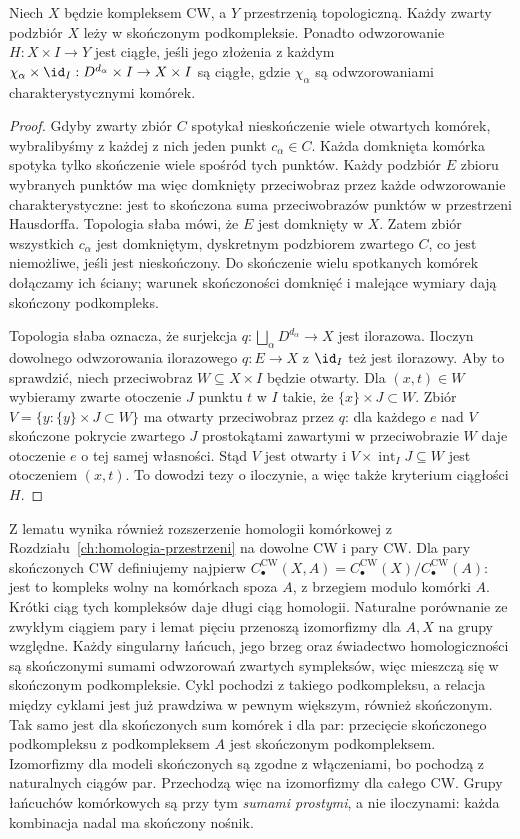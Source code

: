 \begin{lemat}
\label{lem:zwartosc-cw-pi}
Niech $X$ będzie kompleksem CW, a $Y$ przestrzenią topologiczną.
Każdy zwarty podzbiór $X$ leży w skończonym podkompleksie.
Ponadto odwzorowanie $H:X\times I\to Y$ jest ciągłe, jeśli jego złożenia
z każdym $\chi_\alpha\times\id_I:D^{d_\alpha}\times I\to X\times I$
są ciągłe, gdzie $\chi_\alpha$ są odwzorowaniami charakterystycznymi komórek.
\end{lemat}
\begin{proof}
Gdyby zwarty zbiór $C$ spotykał nieskończenie wiele otwartych komórek,
wybralibyśmy z każdej z nich jeden punkt $c_\alpha\in C$.
Każda domknięta komórka spotyka tylko skończenie wiele spośród tych punktów.
Każdy podzbiór $E$ zbioru wybranych punktów ma więc domknięty
przeciwobraz przez każde odwzorowanie charakterystyczne: jest to skończona
suma przeciwobrazów punktów w przestrzeni Hausdorffa.
Topologia słaba mówi, że $E$ jest domknięty w $X$.
Zatem zbiór wszystkich $c_\alpha$ jest domkniętym, dyskretnym
podzbiorem zwartego $C$, co jest niemożliwe, jeśli jest nieskończony.
Do skończenie wielu spotkanych komórek dołączamy ich ściany;
warunek skończoności domknięć i malejące wymiary dają skończony podkompleks.

Topologia słaba oznacza, że surjekcja
$q:\bigsqcup_\alpha D^{d_\alpha}\to X$ jest ilorazowa.
Iloczyn dowolnego odwzorowania ilorazowego $q:E\to X$ z $\id_I$ też jest ilorazowy.
Aby to sprawdzić, niech przeciwobraz $W\subseteq X\times I$ będzie otwarty.
Dla $(x,t)\in W$ wybieramy zwarte otoczenie $J$ punktu $t$ w $I$
takie, że $\{x\}\times J\subset W$. Zbiór
$V=\{y:\{y\}\times J\subset W\}$ ma otwarty przeciwobraz przez $q$:
dla każdego $e$ nad $V$ skończone pokrycie zwartego $J$
prostokątami zawartymi w przeciwobrazie $W$ daje otoczenie $e$
o tej samej własności. Stąd $V$ jest otwarty i
$V\times\operatorname{int}_I J\subseteq W$ jest otoczeniem $(x,t)$.
To dowodzi tezy o iloczynie, a więc także kryterium ciągłości $H$.
\end{proof}

Z lematu wynika również rozszerzenie homologii komórkowej
z Rozdziału~\ref{ch:homologia-przestrzeni} na dowolne CW i pary CW.
Dla pary skończonych CW definiujemy najpierw
$C_\bullet^{\mathrm{CW}}(X,A)=C_\bullet^{\mathrm{CW}}(X)/C_\bullet^{\mathrm{CW}}(A)$:
jest to kompleks wolny na komórkach spoza $A$, z brzegiem modulo komórki $A$.
Krótki ciąg tych kompleksów daje długi ciąg homologii.
Naturalne porównanie ze zwykłym ciągiem pary i lemat pięciu
przenoszą izomorfizmy dla $A,X$ na grupy względne.
Każdy singularny łańcuch, jego brzeg oraz świadectwo homologiczności
są skończonymi sumami odwzorowań zwartych sympleksów, więc mieszczą się
w skończonym podkompleksie. Cykl pochodzi z takiego podkompleksu,
a relacja między cyklami jest już prawdziwa w pewnym większym,
również skończonym. Tak samo jest dla skończonych sum komórek
i dla par: przecięcie skończonego podkompleksu z podkompleksem $A$
jest skończonym podkompleksem. Izomorfizmy dla modeli skończonych
są zgodne z włączeniami, bo pochodzą z naturalnych ciągów par.
Przechodzą więc na izomorfizmy dla całego CW.
Grupy łańcuchów komórkowych są przy tym \emph{sumami prostymi},
a nie iloczynami: każda kombinacja nadal ma skończony nośnik.

